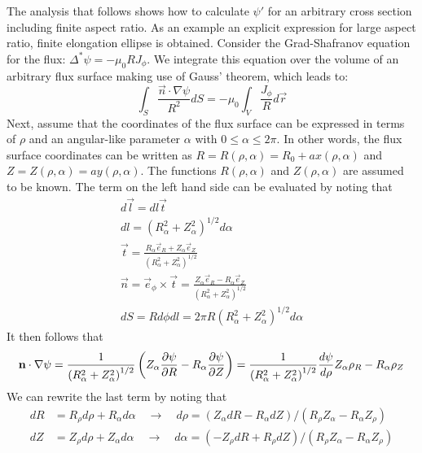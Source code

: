 The analysis that follows shows how to calculate $\psi'$ for an arbitrary cross section including finite aspect ratio. As an example an explicit expression for large aspect ratio, finite elongation ellipse is obtained. Consider the Grad-Shafranov equation for the flux: $\Delta^* \psi = -\mu_0 R J_\phi$. We integrate this equation over the volume of an arbitrary flux surface making use of Gauss' theorem, which leads to:
\begin{equation}
	\label{eq:gauss}
	\int_S \frac{ \vec n \cdot \nabla \psi }{R^2} dS = -\mu_0 \int_V \frac{ J_\phi}{R} d \vec r
\end{equation}
Next, assume that the coordinates of the flux surface can be expressed in terms of $\rho$ and an angular-like parameter $\alpha$ with $0 \le \alpha \le 2 \pi$. In other words, the flux surface coordinates can be written as $R = R(\rho,\alpha) = R_0 + a x(\rho, \alpha)$ and $Z = Z(\rho,\alpha) = a y(\rho, \alpha)$. The functions $R(\rho,\alpha)$ and $Z(\rho,\alpha)$ are assumed to be known. The term on the left hand side can be evaluated by noting that
\begin{gather}
	d \vec l = dl \vec t \\
	dl = ( R_\alpha^2 + Z_\alpha^2 )^{1/2} d\alpha \\
	\vec t = \frac{R_\alpha \vec e_R + Z_\alpha \vec e_Z }{ ( R_\alpha^2 + Z_\alpha^2 )^{1/2} } \\
	\vec n = \vec e_\phi \times \vec t = \frac{ Z_\alpha \vec e_R - R_\alpha \vec e_Z }{ ( R_\alpha^2 + Z_\alpha^2 )^{1/2} } \\
	dS = R d \phi d l  = 2 \pi R ( R_\alpha^2 + Z_\alpha^2 )^{1/2} d \alpha
\end{gather}
It then follows that
\begin{equation}
	\small
	\mathbf { n } \cdot \nabla \psi = \frac { 1 } { \left( R _ { \alpha } ^ { 2 } + Z _ { \alpha } ^ { 2 } \right) ^ { 1 / 2 } } \left( Z _ { \alpha } \frac { \partial \psi } { \partial R } - R _ { \alpha } \frac { \partial \psi } { \partial Z } \right) = \frac { 1 } { \left( R _ { \alpha } ^ { 2 } + Z _ { \alpha } ^ { 2 } \right) ^ { 1 / 2 } } \frac { d \psi } { d \rho } Z _ { \alpha } \rho _ { R } - R _ { \alpha } \rho _ { Z }
\end{equation}
We can rewrite the last term by noting that
\begin{equation}
	\begin{aligned}
	d R & = R _ { \rho } d \rho + R _ { \alpha } d \alpha \quad \rightarrow \quad d \rho = \left( Z _ { \alpha } d R - R _ { \alpha } d Z \right) / \left( R _ { \rho } Z _ { \alpha } - R _ { \alpha } Z _ { \rho } \right) \\ d Z & = Z _ { \rho } d \rho + Z _ { \alpha } d \alpha \quad \rightarrow \quad d \alpha = \left( - Z _ { \rho } d R + R _ { \rho } d Z \right) / \left( R _ { \rho } Z _ { \alpha } - R _ { \alpha } Z _ { \rho } \right)
	\end{aligned}
\end{equation}
